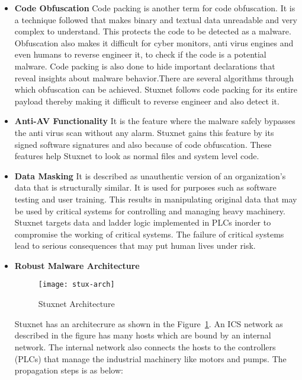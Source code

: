 \documentclass[article,msc=informatik,type=msc,colorback,accentcolor=tud9c]{tudthesis}
\begin{document}
\begin{itemize}
	
	\vspace{3mm}
	\item\textbf{Code Obfuscation} Code packing is another term for code obfuscation. It is a technique followed that makes binary and textual data unreadable and very complex to understand. This protects the code to be detected as a malware. Obfuscation also makes it difficult for cyber monitors, anti virus engines and even humans to reverse engineer it, to check if the code is a potential malware. Code packing is also done to hide important declarations that reveal insights about malware behavior.There are several algorithms through which obfuscation can be achieved. Stuxnet follows code packing for its entire payload thereby making it difficult to reverse engineer and also detect it.


	\vspace{3mm}
	\item\textbf{Anti-AV Functionality} It is the feature where the malware safely bypasses the anti virus scan without any alarm. Stuxnet gains this feature by its signed software signatures and also because of code obfuscation. These features help Stuxnet to look as normal files and system level code.


	\vspace{3mm}
	\item\textbf{Data Masking} It is described as unauthentic version of an organization's data that is structurally similar. It is used for purposes such as software testing and user training. This results in manipulating original data that may be used by critical systems for controlling and managing heavy machinery. Stuxnet targets data and ladder logic implemented in \ac{PLC}s inorder to compromise the working of critical systems. The failure of critical systems lead to serious consequences that may put human lives under risk.


	\vspace{3mm}

	\item\textbf{Robust Malware Architecture} 
	
	\begin{figure}[h]
	\centering
	        \texttt{[image: stux-arch]}
	        \caption[Stuxnet Architecture]{\label{f:Stuxnet Architecture}Stuxnet Architecture}
	\end{figure}

	Stuxnet has an architecrure as shown in the Figure~\ref{f:Stuxnet Architecture}. An \ac{ICS} network as described in the figure has many hosts which are bound by an internal network. The internal network also connects the hosts to the controllers (\ac{PLC}s) that manage the industrial machinery like motors and pumps. The propagation steps is as below:
	\vspace{3mm}


\end{itemize}
\end{document}
